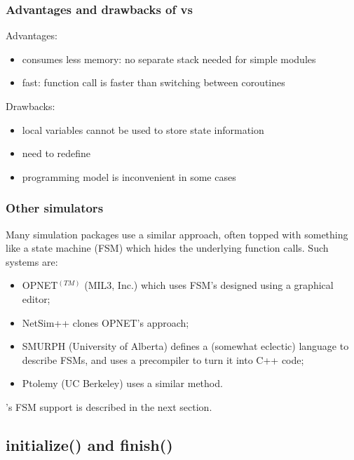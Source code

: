 \subsubsection{Advantages and drawbacks of  vs }


Advantages:
\begin{itemize}
\item{consumes less memory: no separate stack needed for
    simple modules}
\item{fast: function call is faster than switching between coroutines}
\end{itemize}


Drawbacks:
\begin{itemize}
\item{local variables cannot be used to store state information}
\item{need to redefine }
\item{programming model is inconvenient in some cases}
\end{itemize}

\subsubsection{Other simulators}


Many simulation packages use a similar approach, often topped with
something like a state machine
(FSM) which hides the underlying function calls. Such
systems are:
\begin{itemize}
  \item{OPNET$^{(TM)}$ (MIL3, Inc.) which uses FSM's designed using a graphical editor;}
  \item{NetSim++ clones OPNET's approach;}
  \item{SMURPH (University of Alberta) defines a (somewhat eclectic)
      language to describe FSMs, and uses a precompiler to turn it
      into C++ code;}
  \item{Ptolemy (UC Berkeley) uses a similar method.}
\end{itemize}

{\opp}'s FSM support is described in the next section.



\subsection{initialize() and finish()}

